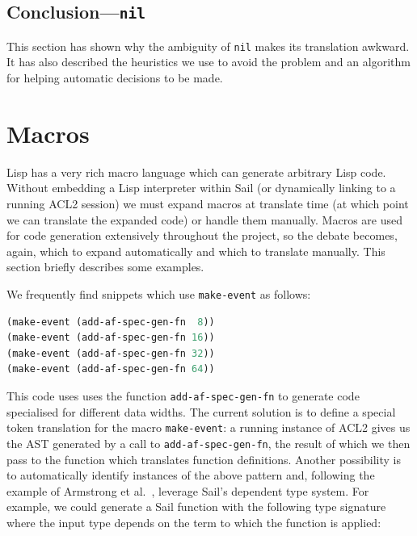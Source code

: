 \documentclass[a4paper,12pt,twoside,openright]{report}
\begin{document}
\subsection{Conclusion---\texttt{nil}}

This section has shown why the ambiguity of \texttt{nil} makes its translation awkward.  It has also described the heuristics we use to avoid the problem and an algorithm for helping automatic decisions to be made.

\hypertarget{macros}{
\section{Macros}\label{macros}}

Lisp has a very rich macro language which can generate arbitrary Lisp code.  Without embedding a Lisp interpreter within Sail (or dynamically linking to a running ACL2 session) we must expand macros at translate time (at which point we can translate the expanded code) or handle them manually.  Macros are used for code generation extensively throughout the project, so the debate becomes, again, which to expand automatically and which to translate manually.  This section briefly describes some examples.

We frequently find snippets which use \texttt{make-event} as follows:

\begin{minipage}{\linewidth}
\begin{lstlisting}[language=lisp]
(make-event (add-af-spec-gen-fn  8))
(make-event (add-af-spec-gen-fn 16))
(make-event (add-af-spec-gen-fn 32))
(make-event (add-af-spec-gen-fn 64))
\end{lstlisting}
\end{minipage}

This code uses uses the function \texttt{add-af-spec-gen-fn} to generate code specialised for different data widths.  The current solution is to define a special token translation for the macro \texttt{make-event}: a running instance of ACL2 gives us the AST generated by a call to \texttt{add-af-spec-gen-fn}, the result of which we then pass to the function which translates function definitions.  Another possibility is to automatically identify instances of the above pattern and, following the example of Armstrong et al.~\cite[Sec.~3.1]{sail-paper}, leverage Sail's dependent type system.  For example, we could generate a Sail function with the following type signature where the input type depends on the term to which the function is applied:
\end{document}
